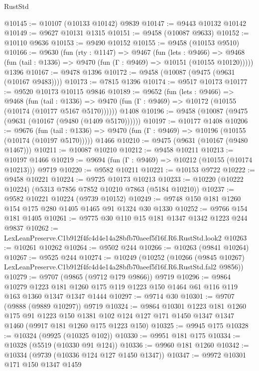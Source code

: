\begin{lexlean}{RustStd}
\begin{coremodule}
@10145 := @10107 (@10133 @10142) @9839
@10147 := @9443 @10132 @10142
@10149 := @9627 @10131 @1315
@10151 := @9458 (@10087 @9633)
@10152 := @10110 @9636
@10153 := @9490 @10152
@10155 := @9458 (@10153 @9510)
@10166 := @9630
    (fun (rty : @1147) =>
    @9467
      (fun (lets : @9466) =>
      @9468 (fun (tail : @1336) => @9470 (fun (Γ : @9469) => @10151 (@10155 @10120)))))
    @1396
@10167 := @9478 @1396
@10172 := @9458 (@10087 (@9475 (@9631 (@10167 @9483))))
@10173 := @7815 @1396
@10174 := @9517 @10173
@10177 := @9520 @10173 @10115 @9846
@10189 := @9652
    (fun (lets : @9466) =>
    @9468
      (fun (tail : @1336) =>
      @9470 (fun (Γ : @9469) => @10172 (@10155 (@10174 (@10177 @5167 @5170))))))
    @1408
@10196 := @9458 (@10087 (@9475 (@9631 (@10167 (@9480 (@1409 @5170))))))
@10197 := @10177 @1408
@10206 := @9676
    (fun (tail : @1336) => @9470 (fun (Γ : @9469) => @10196 (@10155 (@10174 (@10197 @5170)))))
    @1466
@10210 := @9475 (@9631 (@10167 (@9480 @1467)))
@10211 := @10087 @10210
@10212 := @9458 @10211
@10213 := @10197 @1466
@10219 := @9694 (fun (Γ : @9469) => @10212 (@10155 (@10174 @10213))) @9719
@10220 := @9582 @10211
@10221 := @10153 @9722
@10222 := @9458 @10221
@10224 := @9725 @10173 @10213
@10233 := @10220 (@10222 @10224) (@5313 @7856 @7852 @10210 @7863 (@5184 @10210))
@10237 := @9582 @10221 @10224 (@9739 @10152)
@10249 := @9748 @150 @181 @1260 @154 @175 @280 @1405 @1465 @91 @1324 @30 @1330
@10252 := @9766 @154 @181 @1405
@10261 := @9775 @30 @110 @15 @181 @1347 @1342 @1223 @244 @9837
@10262 := LexLeanPreserve.C1b912f4fc4d4e14a28bfb70aeef5f16f.R6.RustStd.look2
@10263 := @10261 @10262
@10264 := @9502 @244
@10266 := @10263 (@9841 @10264)
@10267 := @9525 @244
@10274 := @10249
    (@10252
      (@10266
        (@9845 @10267)
        LexLeanPreserve.C1b912f4fc4d4e14a28bfb70aeef5f16f.R6.RustStd.fal2
        @9856))
@10279 := @9707 (@9865 (@9712 @179 @9866)) @9719
@10296 := @9864
    @10279
    @1223
    @181
    @1260
    @175
    @119
    @1223
    @150
    @1464
    @61
    @116
    @119
    @163
    @1360
    @1347
    @1347
    @1444
@10297 := @9714 @30
@10301 := @9707 (@9888 (@9889 @10297)) @9719
@10324 := @9864
    @10301
    @1223
    @181
    @1260
    @175
    @91
    @1223
    @150
    @1381
    @102
    @124
    @127
    @171
    @1450
    @1347
    @1347
    @1460
    (@9917 @181 @1260 @175 @1223 @150)
@10325 := @9945 @175
@10328 := @10324 (@9925 (@10325 @102))
@10330 := @9951 @181 @175
@10334 := @10328 (@5519 (@10330 @91 @124))
@10336 := @9960 @181 @1260
@10342 := @10334 (@9739 (@10336 @124 @127 @1450 @1347))
@10347 := @9972 @10301 @171 @150 @1347 @1459

\end{coremodule}
\end{lexlean}
